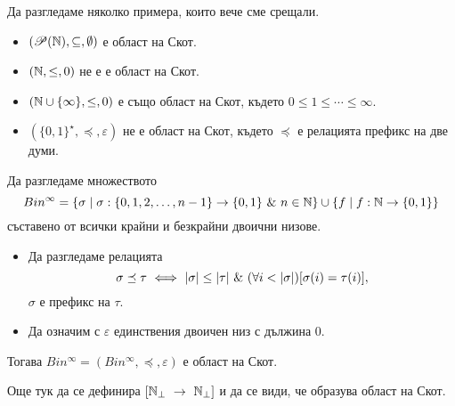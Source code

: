\begin{example}
  Да разгледаме няколко примера, които вече сме срещали.
  \begin{itemize}
  \item
    $(\mathscr{P}(\mathbb{N}),\subseteq,\emptyset)$ е област на Скот.
  \item
    $(\mathbb{N}, \leq, 0)$ не е е област на Скот.
  \item
    $(\mathbb{N}\cup\{\infty\}, \leq, 0)$ е също област на Скот, където $0 \leq 1 \leq \cdots \leq \infty$.
  \item
    $(\{0,1\}^\star, \preceq, \varepsilon)$ не е област на Скот, където $\preceq$ е релацията префикс на две думи.
  \end{itemize}
\end{example}

\begin{example}
  Да разгледаме множеството 
  \[Bin^\infty = \{\sigma \mid \sigma :\{0,1,2,\dots,n-1\} \to \{0,1\}\ \&\ n \in \mathbb{N}\} \cup 
  \{f \mid f:\mathbb{N} \to \{0,1\}\}\]
  съставено от всички крайни и безкрайни двоични низове.
  \begin{itemize}
  \item
    Да разгледаме релацията
    \[\sigma \preceq \tau \ \Longleftrightarrow\  \vert{\sigma}\vert \leq \vert{\tau}\vert\ \&\ (\forall i < |\sigma|)[\sigma(i) = \tau(i)],\]
    $\sigma$ е префикс на $\tau$.    
  \item
    Да означим с $\varepsilon$ единствения двоичен низ с дължина $0$.
  \end{itemize}
  Тогава $Bin^\infty = (Bin^\infty,\preceq,\varepsilon)$ е област на Скот.
\end{example}

Още тук да се дефинира $[\mathbb{N}_\bot~\to~\mathbb{N}_\bot]$ и да се види, че образува област на Скот.

